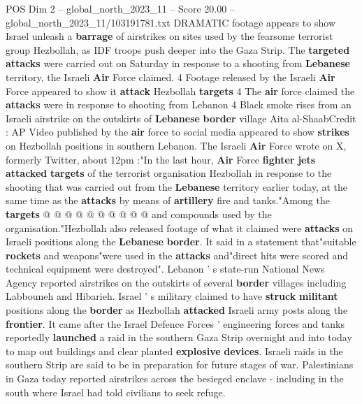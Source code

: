 \begin{textsample}{POS Dim 2 – global\_north\_2023\_11 – Score 20.00 – global\_north\_2023\_11/103191781.txt}  \label{ex:f2_pos_309}
DRAMATIC footage appears to show Israel unleash a \textbf{barrage} of airstrikes on sites used by the fearsome terrorist group Hezbollah, as IDF troops push deeper into the Gaza Strip.
The \textbf{targeted} \textbf{attacks} were carried out on Saturday in response to a shooting from \textbf{Lebanese} territory, the Israeli \textbf{Air} Force claimed. 4 Footage released by the Israeli \textbf{Air} Force appeared to show it \textbf{attack} Hezbollah \textbf{targets} 4 The \textbf{air} force claimed the \textbf{attacks} were in response to shooting from Lebanon 4 Black smoke rises from an Israeli airstrike on the outskirts of \textbf{Lebanese} \textbf{border} village Aita al-ShaabCredit : AP Video published by the \textbf{air} force to social media appeared to show \textbf{strikes} on Hezbollah positions in southern Lebanon.
The Israeli \textbf{Air} Force wrote on X, formerly Twitter, about 12pm :"In the last hour, \textbf{Air} Force \textbf{fighter} \textbf{jets} \textbf{attacked} \textbf{targets} of the terrorist organisation Hezbollah in response to the shooting that was carried out from the \textbf{Lebanese} territory earlier today, at the same time as the \textbf{attacks} by means of \textbf{artillery} fire and tanks."Among the \textbf{targets} @ @ @ @ @ @ @ @ @ @ and compounds used by the organisation."Hezbollah also released footage of what it claimed were \textbf{attacks} on Israeli positions along the \textbf{Lebanese} \textbf{border}.
It said in a statement that"suitable \textbf{rockets} and weapons"were used in the \textbf{attacks} and"direct hits were scored and technical equipment were destroyed".
Lebanon ' s state-run National News Agency reported airstrikes on the outskirts of several \textbf{border} villages including Labbouneh and Hibarieh.
Israel ' s military claimed to have \textbf{struck} \textbf{militant} positions along the \textbf{border} as Hezbollah \textbf{attacked} Israeli army posts along the \textbf{frontier}.
It came after the Israel Defence Forces ' engineering forces and tanks reportedly \textbf{launched} a raid in the southern Gaza Strip overnight and into today to map out buildings and clear planted \textbf{explosive} \textbf{devices}.
Israeli raids in the southern Strip are said to be in preparation for future stages of war.
Palestinians in Gaza today reported airstrikes across the besieged enclave - including in the south where Israel had told civilians to seek refuge.

\end{textsample}
